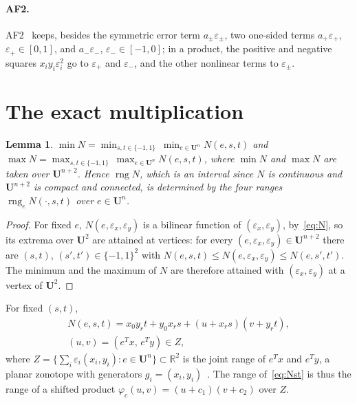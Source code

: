 \documentclass[10pt]{article}
\newtheorem{lemma}[theorem]{Lemma}
\theoremstyle{definition}
\newcommand{\U}{\mathbf{U}}
\newcommand{\R}{\mathbb{R}}
\newcommand{\eps}{\varepsilon}
\newcommand{\ex}{\eps_x}
\newcommand{\ey}{\eps_y}
\newcommand{\rng}{\operatorname{rng}}
\begin{document}
\paragraph{AF2.} AF2~\cite{messine2002extentions} keeps, besides the symmetric error term $a_\pm\eps_\pm$, two one-sided terms $a_+\eps_+$, $\eps_+\in[0,1]$, and $a_-\eps_-$, $\eps_-\in[-1,0]$; in a product, the positive and negative squares $x_iy_i\eps_i^2$ go to $\eps_+$ and $\eps_-$, and the other nonlinear terms to $\eps_\pm$.

\section{The exact multiplication}
\label{sec:exact}

\begin{lemma}
\label{lem:vertices}
$\min N = \min_{s,t\in\{-1,1\}}\ \min_{e\in\U^n} N(e,s,t)$ and $\max N = \max_{s,t\in\{-1,1\}}\ \max_{e\in\U^n} N(e,s,t)$, where $\min N$ and $\max N$ are taken over $\U^{n+2}$. Hence $\rng N$, which is an interval since $N$ is continuous and $\U^{n+2}$ is compact and connected, is determined by the four ranges $\rng_e N(\cdot,s,t)$ over $e\in\U^n$.
\end{lemma}
\begin{proof}
For fixed $e$, $N(e,\ex,\ey)$ is a bilinear function of $(\ex,\ey)$, by~\eqref{eq:N}, so its extrema over $\U^2$ are attained at vertices: for every $(e,\ex,\ey)\in\U^{n+2}$ there are $(s,t)$, $(s',t')\in\{-1,1\}^2$ with $N(e,s,t)\le N(e,\ex,\ey)\le N(e,s',t')$. The minimum and the maximum of $N$ are therefore attained with $(\ex,\ey)$ at a vertex of $\U^2$.
\end{proof}

For fixed $(s,t)$,
\begin{equation}
\label{eq:Nst}
\begin{gathered}N(e,s,t) = x_0y_rt+y_0x_rs + (u + x_rs)(v + y_rt),\\ (u,v)=(e^Tx,\,e^Ty)\in Z,\end{gathered}
\end{equation}
where $Z=\{\sum_i\eps_i(x_i,y_i): e\in\U^n\}\subset\R^2$ is the joint range of $e^Tx$ and $e^Ty$, a planar zonotope with generators $g_i=(x_i,y_i)$~\cite{ziegler1995lectures}. The range of~\eqref{eq:Nst} is thus the range of a shifted product $\varphi_c(u,v)=(u+c_1)(v+c_2)$ over $Z$.
\end{document}
